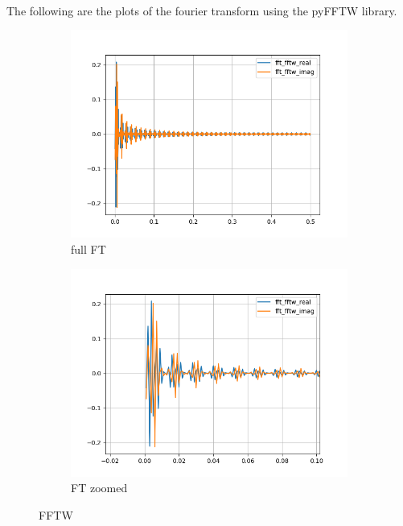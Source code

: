 \documentclass[12pt]{article}
\begin{document}
\\\\\\
The following are the plots of the fourier transform using the pyFFTW library.
\begin{figure}[h]
	\centering
	\begin{subfigure}[h]{0.40\textwidth}
		\centering
		\includegraphics[width=\textwidth]{freq_domain_fftw.png}
		\caption{full FT}
	\end{subfigure}
	\begin{subfigure}[h]{0.40\textwidth}
		\centering
		\includegraphics[width=\textwidth]{freq_domain_fftw-zoom.png}
		\caption{FT zoomed}
	\end{subfigure}
	\caption{FFTW}
\end{figure}
\end{document}
